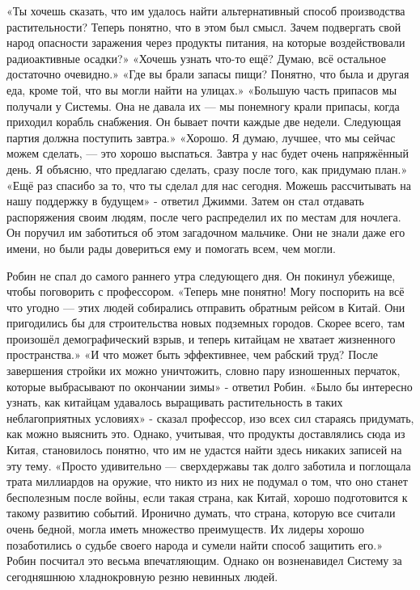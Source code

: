 \documentclass[a4paper,12pt]{book}
\begin{document}
	«Ты хочешь сказать, что им удалось найти альтернативный способ производства растительности? Теперь понятно, что в этом был смысл. Зачем подвергать свой народ опасности заражения через продукты питания, на которые воздействовали радиоактивные осадки?»
	«Хочешь узнать что-то ещё? Думаю, всё остальное достаточно очевидно.»
	«Где вы брали запасы пищи? Понятно, что была и другая еда, кроме той, что вы могли найти на улицах.»
	«Большую часть припасов мы получали у Системы. Она не давала их — мы понемногу крали припасы, когда приходил корабль снабжения. Он бывает почти каждые две недели. Следующая партия должна поступить завтра.»
	«Хорошо. Я думаю, лучшее, что мы сейчас можем сделать, — это хорошо выспаться. Завтра у нас будет очень напряжённый день. Я объясню, что предлагаю сделать, сразу после того, как придумаю план.»
	«Ещё раз спасибо за то, что ты сделал для нас сегодня. Можешь рассчитывать на нашу поддержку в будущем» - ответил Джимми. Затем он стал отдавать распоряжения своим людям, после чего распределил их по местам для ночлега. Он поручил им заботиться об этом загадочном мальчике. Они не знали даже его имени, но были рады довериться ему и помогать всем, чем могли.

	Робин не спал до самого раннего утра следующего дня. Он покинул убежище, чтобы поговорить с профессором.
	«Теперь мне понятно! Могу поспорить на всё что угодно — этих людей собирались отправить обратным рейсом в Китай. Они пригодились бы для строительства новых подземных городов. Скорее всего, там произошёл демографический взрыв, и теперь китайцам не хватает жизненного пространства.»
	«И что может быть эффективнее, чем рабский труд? После завершения стройки их можно уничтожить, словно пару изношенных перчаток, которые выбрасывают по окончании зимы» - ответил Робин.
	«Было бы интересно узнать, как китайцам удавалось выращивать растительность в таких неблагоприятных условиях» - сказал профессор, изо всех сил стараясь придумать, как можно выяснить это. Однако, учитывая, что продукты доставлялись сюда из Китая, становилось понятно, что им не удастся найти здесь никаких записей на эту тему.
	«Просто удивительно — сверхдержавы так долго заботила и поглощала трата миллиардов на оружие, что никто из них не подумал о том, что оно станет бесполезным после войны, если такая страна, как Китай, хорошо подготовится к такому развитию событий. Иронично думать, что страна, которую все считали очень бедной, могла иметь множество преимуществ. Их лидеры хорошо позаботились о судьбе своего народа и сумели найти способ защитить его.»
	Робин посчитал это весьма впечатляющим. Однако он возненавидел Систему за сегодняшнюю хладнокровную резню невинных людей.
\end{document}
